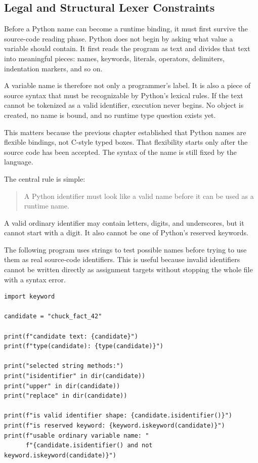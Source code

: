 \subsection{Legal and Structural Lexer Constraints}

Before a Python name can become a runtime binding, it must first survive the source-code reading phase. Python does not begin by asking what value a variable should contain. It first reads the program as text and divides that text into meaningful pieces: names, keywords, literals, operators, delimiters, indentation markers, and so on.

A variable name is therefore not only a programmer's label. It is also a piece of source syntax that must be recognizable by Python's lexical rules. If the text cannot be tokenized as a valid identifier, execution never begins. No object is created, no name is bound, and no runtime type question exists yet.

This matters because the previous chapter established that Python names are flexible bindings, not C-style typed boxes. That flexibility starts only after the source code has been accepted. The syntax of the name is still fixed by the language.

The central rule is simple:

\begin{quote}
A Python identifier must look like a valid name before it can be used as a runtime name.
\end{quote}

A valid ordinary identifier may contain letters, digits, and underscores, but it cannot start with a digit. It also cannot be one of Python's reserved keywords.

The following program uses strings to test possible names before trying to use them as real source-code identifiers. This is useful because invalid identifiers cannot be written directly as assignment targets without stopping the whole file with a syntax error.

\begin{verbatim}
import keyword

candidate = "chuck_fact_42"

print(f"candidate text: {candidate}")
print(f"type(candidate): {type(candidate)}")

print("selected string methods:")
print("isidentifier" in dir(candidate))
print("upper" in dir(candidate))
print("replace" in dir(candidate))

print(f"is valid identifier shape: {candidate.isidentifier()}")
print(f"is reserved keyword: {keyword.iskeyword(candidate)}")
print(f"usable ordinary variable name: "
      f"{candidate.isidentifier() and not keyword.iskeyword(candidate)}")
\end{verbatim}


